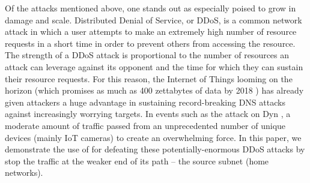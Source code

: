 Of the attacks mentioned above, one stands out as especially poised to grow in damage and scale. Distributed Denial of Service, or DDoS, is a common network attack in which a user attempts to make an extremely high number of resource requests in a short time in order to prevent others from accessing the resource. The strength of a DDoS attack is proportional to the number of resources an attack can leverage against its opponent and the time for which they can sustain their resource requests. For this reason, the Internet of Things looming on the horizon (which promises as much as 400 zettabytes of data by 2018 \cite{zetta}) has already given attackers a huge advantage in sustaining record-breaking DNS attacks against increasingly worrying targets. In events such as the attack on Dyn \cite{dyn}, a moderate amount of traffic passed from an unprecedented number of unique devices (mainly IoT cameras) to create an overwhelming force.  In this paper, we demonstrate the use of \sysname for defeating these potentially-enormous DDoS attacks by stop the traffic at the weaker end of its path -- the source subnet (home networks). 
